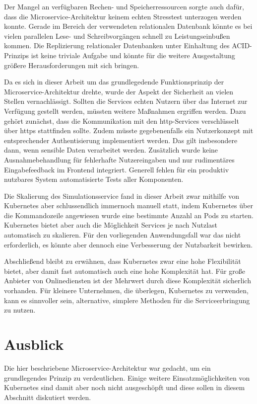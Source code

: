 \documentclass[11pt,a4paper]{article}
\begin{document}
Der Mangel an verfügbaren Rechen- und Speicherressourcen sorgte auch dafür,
dass die Microservice-Architektur keinem echten Stresstest unterzogen werden konnte.
Gerade im Bereich der verwendeten relationalen Datenbank könnte es bei vielen
parallelen Lese- und Schreibvorgängen schnell zu Leistungseinbußen kommen.
Die Replizierung relationaler Datenbanken unter Einhaltung des ACID-Prinzips
ist keine triviale Aufgabe und könnte für die weitere Ausgestaltung 
größere Herausforderungen mit sich bringen.

Da es sich in dieser Arbeit um das grundlegedende Funktionsprinzip der Microservice-Architektur drehte,
wurde der Aspekt der Sicherheit an vielen Stellen vernachlässigt. Sollten die Services echten
Nutzern über das Internet zur Verfügung gestellt werden, müssten weitere Maßnahmen ergriffen werden.
Dazu gehört zunächst, dass die Kommunikation mit den http-Services verschlüsselt über https
stattfinden sollte. Zudem müsste gegebenenfalls ein Nutzerkonzept mit entsprechender
Authentisierung implementiert werden. Das gilt insbesondere dann, wenn sensible
Daten verarbeitet werden. Zusätzlich wurde keine Ausnahmebehandlung für fehlerhafte
Nutzereingaben und nur rudimentäres Eingabefeedback im Frontend integriert.
Generell fehlen für ein produktiv nutzbares System automatisierte Tests
aller Komponenten.

Die Skalierung des Simulationsservice fand in dieser Arbeit zwar mithilfe von Kubernetes
aber schlussendlich immernoch manuell statt, indem Kubernetes über die Kommandozeile angewiesen wurde
eine bestimmte Anzahl an Pods zu starten. Kubernetes bietet aber auch die Möglichkeit 
Services je nach Nutzlast automatisch zu skalieren. Für den vorliegenden 
Anwendungsfall war das nicht erforderlich, es könnte aber dennoch eine Verbesserung 
der Nutzbarkeit bewirken.

Abschließend bleibt zu erwähnen, dass Kubernetes zwar eine hohe Flexibilität bietet,
aber damit fast automatisch auch eine hohe Komplexität hat. Für große Anbieter von Onlinediensten
ist der Mehrwert durch diese Komplexität sicherlich vorhanden.
Für kleinere Unternehmen, die überlegen, Kubernetes zu verwenden, kann es sinnvoller sein,
alternative, simplere Methoden für die Serviceerbringung zu nutzen.

\section{Ausblick}
\label{sec:Ausblick}
Die hier beschriebene Microservice-Architektur war gedacht, um ein grundlegendes Prinzip
zu verdeutlichen. Einige weitere Einsatzmöglichkeiten von Kubernetes sind damit aber noch nicht ausgeschöpft 
und diese sollen in diesem Abschnitt diskutiert werden.
\end{document}
